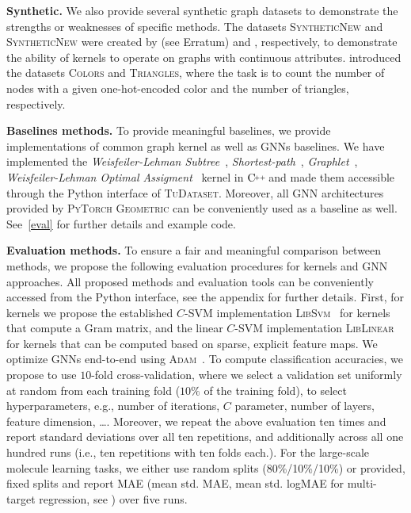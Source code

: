\documentclass{article}
\newcommand{\xhdr}[1]{{\noindent\bfseries #1}}
\theoremstyle{definition}
\newcommand{\new}[1]{\emph{#1}}
\newcommand{\CPP}[1][]{$\text{C\hspace{-.25ex}}^{_{_{_{++}}}}
	\ifthenelse{\equal{#1}{}}{}{\text{\hspace{-.625ex}#1}}$}
\begin{document}
\xhdr{Synthetic.}
We also provide several synthetic graph datasets to demonstrate the strengths or weaknesses of specific methods. The datasets \textsc{SyntheticNew} and \textsc{SyntheticNew} were created by \citet{Fer+2013} (see Erratum) and \citet{Mor+2016}, respectively, to demonstrate the ability of kernels to operate on graphs with continuous attributes. \citet{Knyazev2019} introduced the datasets \textsc{Colors} and \textsc{Triangles}, where the task is to count the number of nodes with a given one-hot-encoded color and the number of triangles, respectively. 

\xhdr{Baselines methods.} To provide meaningful baselines, we provide implementations of common graph kernel as well as GNNs baselines. We have implemented the \new{Weisfeiler-Lehman Subtree}~\cite{She+2011}, \new{Shortest-path}~\cite{Bor+2005}, \new{Graphlet}~\cite{She+2009}, \new{Weisfeiler-Lehman Optimal Assigment}~\cite{Kri+2016} kernel in \CPP and made them accessible through the Python interface of \textsc{TuDataset}.  Moreover, all GNN architectures provided by \textsc{PyTorch Geometric} can be conveniently used as a baseline as well. See~\cref{eval} for further details and example code.

\xhdr{Evaluation methods.}\label{eval} To ensure a fair and meaningful comparison between methods, we propose the following evaluation procedures for kernels and GNN approaches. All proposed methods and evaluation tools can be conveniently accessed from the Python interface, see the appendix for further details. First, for kernels we propose the established $C$-SVM implementation \textsc{LibSvm}~\cite{Cha+11} for kernels that compute a Gram matrix, and the linear $C$-SVM implementation \textsc{LibLinear}~\cite{Fan+2008} for kernels  that can be computed based on sparse, explicit feature maps. We optimize GNNs end-to-end using \textsc{Adam}~\cite{Kin+2015}. To compute classification accuracies, we propose to use $10$-fold cross-validation, where we select a validation set uniformly at random from each training fold ($10\%$ of the training fold), to select hyperparameters, e.g., number of iterations, $C$ parameter, number of layers, feature dimension, \dots. Moreover, we repeat the above evaluation ten times and report standard deviations over all ten repetitions, and additionally across all one hundred runs (i.e., ten repetitions with ten folds each.). For the large-scale molecule learning tasks, we either use random splits (80\%/10\%/10\%) or provided, fixed splits and report MAE (mean std. MAE, mean std. logMAE for multi-target regression, see \cite{Kli+2020}) over five runs. 
\end{document}
